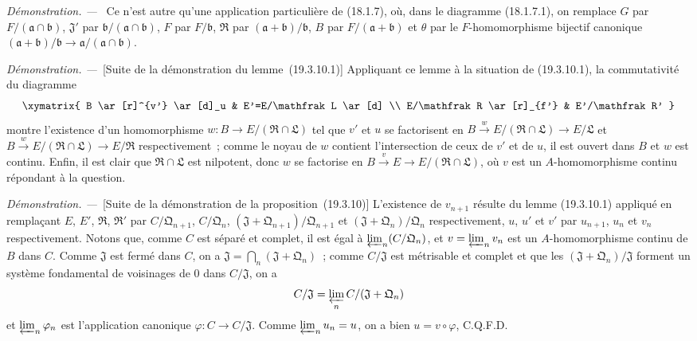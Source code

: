 \documentclass[10pt,oneside]{book}
\newcommand{\oldpage}[2][]{%
  \setcounter{footnote}{0}%
  \marginpar{\scriptsize\textbf{#1}~|~#2}\ignorespaces}
\newenvironment{proof}{%
  \par\medskip\noindent\textit{Démonstration. ---\ }}{\par}
\begin{document}
\begin{proof}
Ce n'est autre qu'une application particulière de (18.1.7), où, dans le
diagramme (18.1.7.1), on remplace $G$ par
$F/(\mathfrak a\cap\mathfrak b)$, $\mathfrak J'$ par
$\mathfrak b/(\mathfrak a\cap\mathfrak b)$, $F$ par
$F/\mathfrak b$, $\mathfrak R$ par
$(\mathfrak a+\mathfrak b)/\mathfrak b$, $B$ par
$F/(\mathfrak a+\mathfrak b)$ et $\theta$ par le $F$-homomorphisme
bijectif canonique
$(\mathfrak a+\mathfrak b)/\mathfrak b\to
\mathfrak a/(\mathfrak a\cap\mathfrak b)$.
\end{proof}

\oldpage[0\textsubscript{IV-1}]{85}

\begin{proof}[Suite de la démonstration du lemme~{\rm(19.3.10.1)}]
Appliquant ce lemme à la situation de (19.3.10.1), la commutativité du
diagramme
\[
\xymatrix{
  B \ar[r]^{v'} \ar[d]_u & E'=E/\mathfrak L \ar[d] \\
  E/\mathfrak R \ar[r]_{f'} & E'/\mathfrak R'
}
\]
montre l'existence d'un homomorphisme
$w:B\to E/(\mathfrak R\cap\mathfrak L)$ tel que $v'$ et $u$ se
factorisent en
$B\xrightarrow{w}E/(\mathfrak R\cap\mathfrak L)\to E/\mathfrak L$
et
$B\xrightarrow{w}E/(\mathfrak R\cap\mathfrak L)\to E/\mathfrak R$
respectivement~; comme le noyau de $w$ contient l'intersection de ceux de
$v'$ et de $u$, il est ouvert dans $B$ et $w$ est continu. Enfin, il est clair
que $\mathfrak R\cap\mathfrak L$ est nilpotent, donc $w$ se factorise en
$B\xrightarrow{v}E\to E/(\mathfrak R\cap\mathfrak L)$, où $v$ est
un $A$-homomorphisme continu répondant à la question.
\end{proof}

\begin{proof}[Suite de la démonstration de la proposition~{\rm(19.3.10)}]
L'existence de $v_{n+1}$ résulte du lemme (19.3.10.1) appliqué en remplaçant
$E$, $E'$, $\mathfrak R$, $\mathfrak R'$ par
$C/\mathfrak Q_{n+1}$, $C/\mathfrak Q_n$,
$(\mathfrak J+\mathfrak Q_{n+1})/\mathfrak Q_{n+1}$ et
$(\mathfrak J+\mathfrak Q_n)/\mathfrak Q_n$ respectivement, $u$, $u'$
et $v'$ par $u_{n+1}$, $u_n$ et $v_n$ respectivement. Notons que, comme $C$
est séparé et complet, il est égal à $\varprojlim_n(C/\mathfrak Q_n)$, et
$v=\varprojlim_n v_n$ est un $A$-homomorphisme continu de $B$ dans $C$.
Comme $\mathfrak J$ est fermé dans $C$, on a
$\mathfrak J=\bigcap_n(\mathfrak J+\mathfrak Q_n)$~; comme
$C/\mathfrak J$ est métrisable et complet et que les
$(\mathfrak J+\mathfrak Q_n)/\mathfrak J$ forment un système fondamental
de voisinages de $0$ dans $C/\mathfrak J$, on a
\[
  C/\mathfrak J=\varprojlim_n C/(\mathfrak J+\mathfrak Q_n)
\]
et $\varprojlim_n\varphi_n$ est l'application canonique
$\varphi:C\to C/\mathfrak J$. Comme $\varprojlim_n u_n=u$, on a bien
$u=v\circ\varphi$, C.Q.F.D.
\end{proof}
\end{document}
